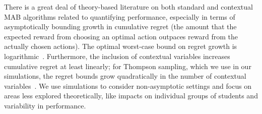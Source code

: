 There is a great deal of theory-based literature on both standard and contextual MAB algorithms related to quantifying performance, especially in terms of asymptotically bounding growth in cumulative regret (the amount that the expected reward from choosing an optimal action outpaces reward from the actually chosen actions). The optimal worst-case bound on regret growth is logarithmic~\cite{auer2002using}.
Furthermore, the inclusion of contextual variables increases cumulative regret at least linearly; for Thompson sampling, which we use in our simulations, the regret bounds grow quadratically in the number of contextual variables~\cite{agrawal2013thompson}.  %
We use simulations to consider non-asymptotic settings and focus on areas less explored theoretically, like impacts on individual groups of students and variability in performance.


